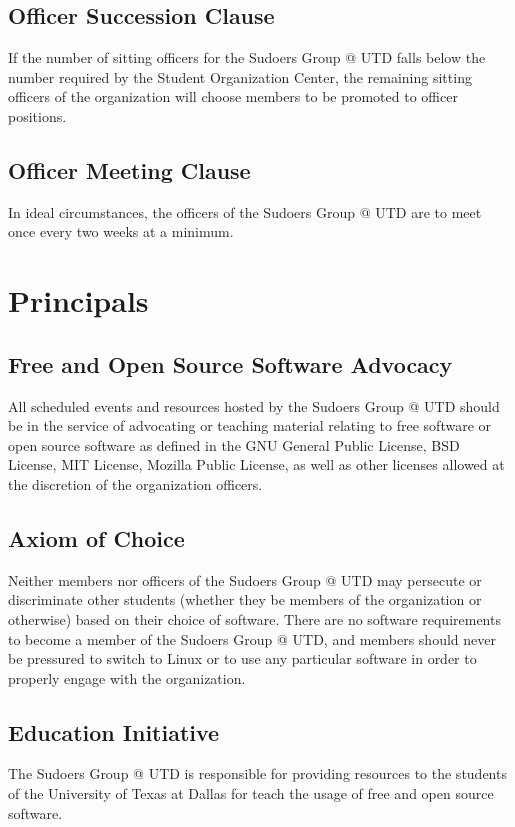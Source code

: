 \documentclass{constitution}
\begin{document}
\subsection{Officer Succession Clause}
If the number of sitting officers for the Sudoers Group @ UTD falls below the number required by the Student Organization Center, the remaining sitting officers of the organization will choose members to be promoted to officer positions.

\subsection{Officer Meeting Clause}
In ideal circumstances, the officers of the Sudoers Group @ UTD are to meet once every two weeks at a minimum.

\section{Principals}

\subsection{Free and Open Source Software Advocacy}
All scheduled events and resources hosted by the Sudoers Group @ UTD should be in the service of advocating or teaching material relating to free software or open source software as defined in the GNU General Public License, BSD License, MIT License, Mozilla Public License, as well as other licenses allowed at the discretion of the organization officers.

\subsection{Axiom of Choice \color{Gold}} Neither members nor officers of the Sudoers Group @ UTD may persecute or discriminate other students (whether they be members of the organization or otherwise) based on their choice of software.
There are no software requirements to become a member of the Sudoers Group @ UTD, and members should never be pressured to switch to Linux or to use any particular software in order to properly engage with the organization.

\subsection{Education Initiative}
The Sudoers Group @ UTD is responsible for providing resources to the students of the University of Texas at Dallas for teach the usage of free and open source software.
\end{document}
